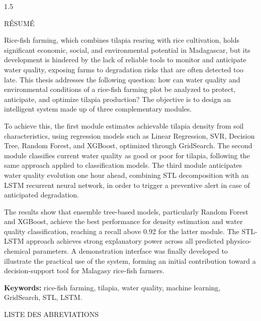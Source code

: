 \documentclass[a4paper,12pt, oneside]{article}
\begin{document}
\vspace*{\fill}
\newpage
\begin{spacing}{1.5}
\begin{center}
\LARGE{RÉSUMÉ}
\end{center}
Rice-fish farming, which combines tilapia rearing with rice cultivation, holds significant economic, social, and environmental potential in Madagascar, but its development is hindered by the lack of reliable tools to monitor and anticipate water quality, exposing farms to degradation risks that are often detected too late. This thesis addresses the following question: how can water quality and environmental conditions of a rice-fish farming plot be analyzed to protect, anticipate, and optimize tilapia production? The objective is to design an intelligent system made up of three complementary modules.

To achieve this, the first module estimates achievable tilapia density from soil characteristics, using regression models such as Linear Regression, SVR, Decision Tree, Random Forest, and XGBoost, optimized through GridSearch. The second module classifies current water quality as good or poor for tilapia, following the same approach applied to classification models. The third module anticipates water quality evolution one hour ahead, combining STL decomposition with an LSTM recurrent neural network, in order to trigger a preventive alert in case of anticipated degradation.

The results show that ensemble tree-based models, particularly Random Forest and XGBoost, achieve the best performance for density estimation and water quality classification, reaching a recall above 0.92 for the latter module. The STL-LSTM approach achieves strong explanatory power across all predicted physico-chemical parameters. A demonstration interface was finally developed to illustrate the practical use of the system, forming an initial contribution toward a decision-support tool for Malagasy rice-fish farmers.

\vspace{0.5cm}
\textbf{Keywords:} rice-fish farming, tilapia, water quality, machine learning, GridSearch, STL, LSTM.
\end{spacing}

\vspace*{\fill}
\newpage

\tableofcontents
\vspace*{\fill}
\newpage

\begin{center}
\Large LISTE DES ABREVIATIONS
\end{center}
\end{document}
